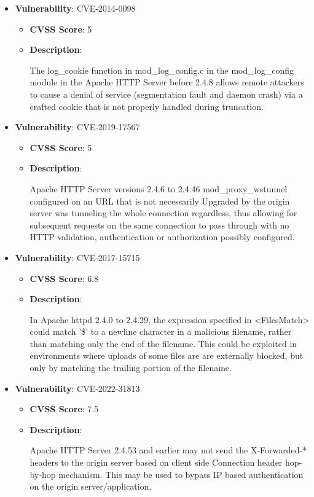 \documentclass{article}
\begin{document}
\begin{itemize}
        \item \textbf{Vulnerability}: CVE-2014-0098
        \begin{itemize}
            \item \textbf{CVSS Score}:  5 
            \item \textbf{Description}:
            \parbox[t]{0.9\linewidth}{
                \ttfamily The log\_cookie function in mod\_log\_config.c in the mod\_log\_config module in the Apache HTTP Server before 2.4.8 allows remote attackers to cause a denial of service (segmentation fault and daemon crash) via a crafted cookie that is not properly handled during truncation.
            }
        \end{itemize}
    
        \item \textbf{Vulnerability}: CVE-2019-17567
        \begin{itemize}
            \item \textbf{CVSS Score}:  5 
            \item \textbf{Description}:
            \parbox[t]{0.9\linewidth}{
                \ttfamily Apache HTTP Server versions 2.4.6 to 2.4.46 mod\_proxy\_wstunnel configured on an URL that is not necessarily Upgraded by the origin server was tunneling the whole connection regardless, thus allowing for subsequent requests on the same connection to pass through with no HTTP validation, authentication or authorization possibly configured.
            }
        \end{itemize}
    
        \item \textbf{Vulnerability}: CVE-2017-15715
        \begin{itemize}
            \item \textbf{CVSS Score}:  6.8 
            \item \textbf{Description}:
            \parbox[t]{0.9\linewidth}{
                \ttfamily In Apache httpd 2.4.0 to 2.4.29, the expression specified in <FilesMatch> could match '\$' to a newline character in a malicious filename, rather than matching only the end of the filename. This could be exploited in environments where uploads of some files are are externally blocked, but only by matching the trailing portion of the filename.
            }
        \end{itemize}
    
        \item \textbf{Vulnerability}: CVE-2022-31813
        \begin{itemize}
            \item \textbf{CVSS Score}:  7.5 
            \item \textbf{Description}:
            \parbox[t]{0.9\linewidth}{
                \ttfamily Apache HTTP Server 2.4.53 and earlier may not send the X-Forwarded-* headers to the origin server based on client side Connection header hop-by-hop mechanism. This may be used to bypass IP based authentication on the origin server/application.
            }
        \end{itemize}
    

\end{itemize}
\end{document}
